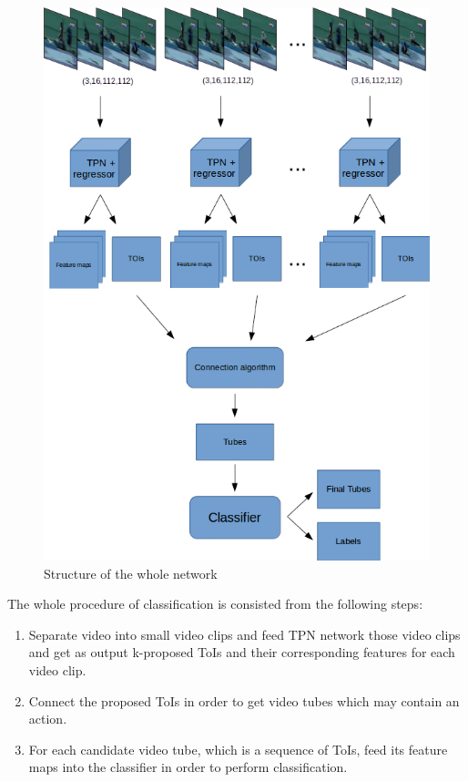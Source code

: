 \documentclass{report}
\begin{document}
\begin{figure}[h]
  \centering
  \includegraphics[scale=0.42]{model_withoutnms_v2}
  \caption{Structure of the whole network}
  \label{fig:whole_network}
\end{figure}

The whole procedure of classification is consisted from the following steps:
\begin{enumerate}
\item Separate video into small video clips and feed TPN network those video clips and get as output
  k-proposed ToIs and their corresponding features for each video clip.
\item Connect the proposed ToIs in order to get video tubes which may contain an action.
\item For each candidate video tube, which is a sequence of ToIs, feed its feature maps  into the classifier
  in order to perform classification.
\end{enumerate}
\end{document}

